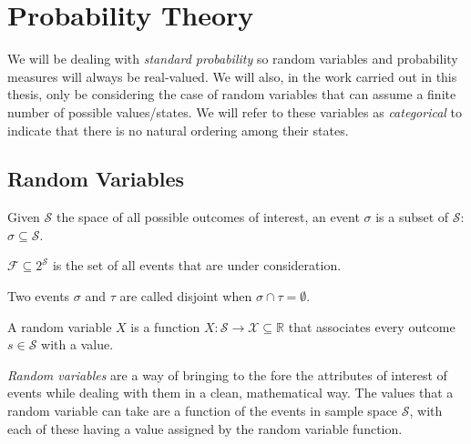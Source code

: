 \section{Probability Theory} \label{sec:probability-theory}
We will be dealing with \textit{standard probability} so random variables and probability measures will always be real-valued.
We will also, in the work carried out in this thesis, only be considering the case of random variables that can assume a finite number of possible values/states.
We will refer to these variables as \textit{categorical} to indicate that there is no natural ordering among their states.

\subsection{Random Variables} \label{subsec:random-variables}
\begin{definition}[Event]
	Given $\mathcal{S}$ the space of all possible outcomes of interest, an event $\sigma$ is a subset of $\mathcal{S}$: $\sigma \subseteq \mathcal{S}$.
	
	$\mathcal{F} \subseteq 2^{\mathcal{S}}$ is the set of all events that are under consideration.
	
	Two events $\sigma$ and $\tau$ are called disjoint when $\sigma \cap \tau = \emptyset$.
\end{definition}

\begin{definition}
	A random variable $X$ is a function $X: \mathcal{S} \rightarrow \mathcal{X} \subseteq \mathbb{R}$ that associates every outcome $s \in \mathcal{S}$ with a value.
\end{definition}

\textit{Random variables} are a way of bringing to the fore the attributes of interest of events while dealing with them in a clean, mathematical way.
The values that a random variable can take are a function of the events in sample space $\mathcal{S}$, with each of these having a value assigned by the random variable function.

